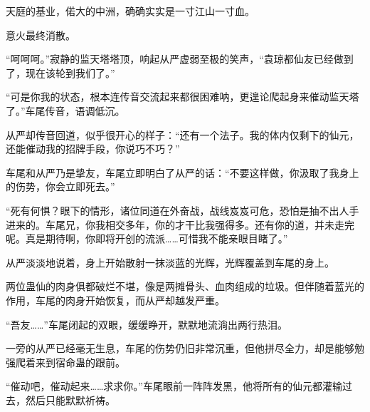\begin{this_body}
天庭的基业，偌大的中洲，确确实实是一寸江山一寸血。

意火最终消散。

“呵呵呵。”寂静的监天塔塔顶，响起从严虚弱至极的笑声，“袁琼都仙友已经做到了，现在该轮到我们了。”

“可是你我的状态，根本连传音交流起来都很困难呐，更遑论爬起身来催动监天塔了。”车尾传音，语调低沉。

从严却传音回道，似乎很开心的样子：“还有一个法子。我的体内仅剩下的仙元，还能催动我的招牌手段，你说巧不巧？”

车尾和从严乃是挚友，车尾立即明白了从严的话：“不要这样做，你汲取了我身上的伤势，你会立即死去。”

“死有何惧？眼下的情形，诸位同道在外奋战，战线岌岌可危，恐怕是抽不出人手进来的。车尾兄，你我相交多年，你的才干比我强得多。还有你的道，并未走完呢。真是期待啊，你即将开创的流派……可惜我不能亲眼目睹了。”

从严淡淡地说着，身上开始散射一抹淡蓝的光辉，光辉覆盖到车尾的身上。

两位蛊仙的肉身俱都破烂不堪，像是两摊骨头、血肉组成的垃圾。但伴随着蓝光的作用，车尾的肉身开始恢复，而从严却越发严重。

“吾友……”车尾闭起的双眼，缓缓睁开，默默地流淌出两行热泪。

一旁的从严已经毫无生息，车尾的伤势仍旧非常沉重，但他拼尽全力，却是能够勉强爬着来到宿命蛊的跟前。

“催动吧，催动起来……求求你。”车尾眼前一阵阵发黑，他将所有的仙元都灌输过去，然后只能默默祈祷。

\end{this_body}

